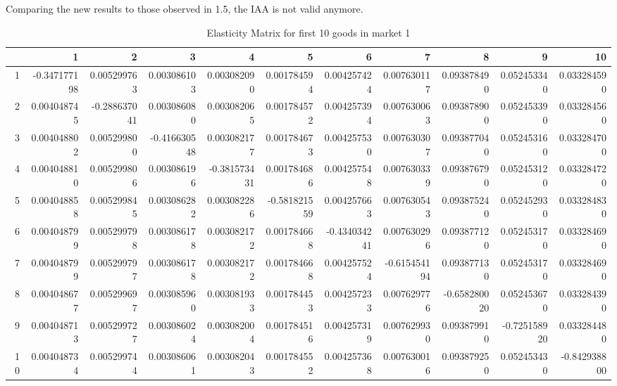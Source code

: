 \documentclass[
]{article}
\begin{document}
Comparing the new results to those observed in 1.5, the IAA is not valid
anymore.

\begin{table}[h!]
\tiny
\centering
\begin{tabular}{r|rrrrrrrrrr}
      & 1            & 2            & 3            & 4            & 5            & 6            & 7            & 8            & 9            & 10           \\
\hline
1  & -0.347177198  & 0.005299763  & 0.003086103  & 0.003082090  & 0.001784594  & 0.004257424  & 0.007630117  & 0.093878490  & 0.052453340  & 0.033284590 \\
2  & 0.004048745   & -0.288637041 & 0.003086080  & 0.003082065  & 0.001784572  & 0.004257394  & 0.007630063  & 0.093878900  & 0.052453390  & 0.033284560 \\
3  & 0.004048802   & 0.005299800  & -0.416630548 & 0.003082177  & 0.001784673  & 0.004257530  & 0.007630307  & 0.093877040  & 0.052453160  & 0.033284700 \\
4  & 0.004048810   & 0.005299806  & 0.003086196  & -0.381573431 & 0.001784686  & 0.004257548  & 0.007630339  & 0.093876790  & 0.052453120  & 0.033284720 \\
5  & 0.004048858   & 0.005299845  & 0.003086282  & 0.003082286  & -0.581821559 & 0.004257663  & 0.007630543  & 0.093875240  & 0.052452930  & 0.033284830 \\
6  & 0.004048799   & 0.005299798  & 0.003086178  & 0.003082172  & 0.001784668  & -0.434034241 & 0.007630296  & 0.093877120  & 0.052453170  & 0.033284690 \\
7  & 0.004048799   & 0.005299797  & 0.003086178  & 0.003082172  & 0.001784668  & 0.004257524  & -0.615454194 & 0.093877130  & 0.052453170  & 0.033284690 \\
8  & 0.004048677   & 0.005299697  & 0.003085960  & 0.003081933  & 0.001784453  & 0.004257233  & 0.007629776  & -0.658280020 & 0.052453670  & 0.033284390 \\
9  & 0.004048713   & 0.005299727  & 0.003086024  & 0.003082004  & 0.001784516  & 0.004257319  & 0.007629930  & 0.093879910  & -0.725158920 & 0.033284480 \\
10 & 0.004048734   & 0.005299744  & 0.003086061  & 0.003082043  & 0.001784552  & 0.004257368  & 0.007630016  & 0.093879250  & 0.052453430  & -0.842938800 \\
\end{tabular}
\caption{Elasticity Matrix for first 10 goods in market 1}
\end{table}
\end{document}
